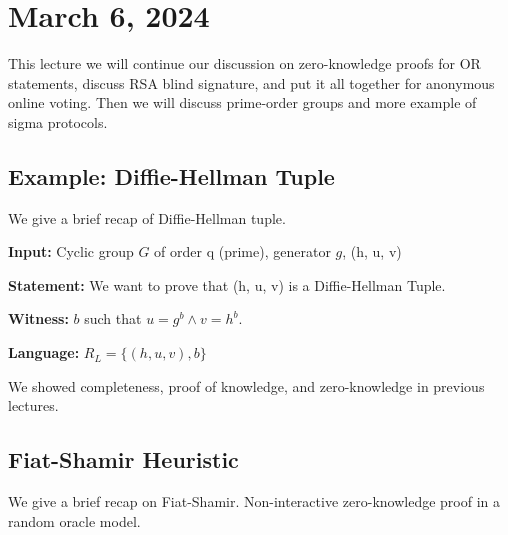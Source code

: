 \section{March 6, 2024}
\label{20240306}

This lecture we will continue our discussion on zero-knowledge proofs for OR statements, discuss RSA blind signature, and put it all together for anonymous online voting. Then we will discuss prime-order groups and more example of sigma protocols.

\subsection{Example: Diffie-Hellman Tuple}

We give a brief recap of Diffie-Hellman tuple.

\textbf{Input:} Cyclic group $G$ of order q (prime), generator $g$, (h, u, v)

\textbf{Statement:} We want to prove that (h, u, v) is a Diffie-Hellman Tuple.

\textbf{Witness:} $b$ such that $u = g^b \wedge v = h^b$.

\textbf{Language:} $R_L = \{ (h, u, v), b\}$


We showed completeness, proof of knowledge, and zero-knowledge in previous lectures.

\subsection{Fiat-Shamir Heuristic}

We give a brief recap on Fiat-Shamir. Non-interactive zero-knowledge proof in a random oracle model. 



